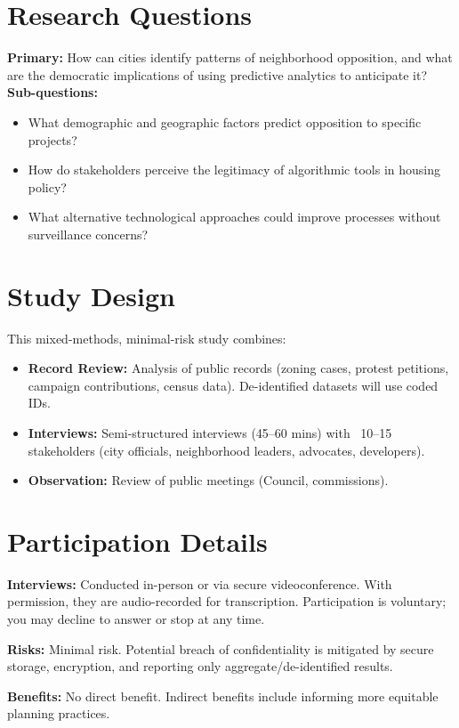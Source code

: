 \documentclass[10pt, letterpaper]{article}
\begin{document}
\section*{Research Questions}
\textbf{Primary:} How can cities identify patterns of neighborhood opposition, and what are the democratic implications of using predictive analytics to anticipate it? \\
\textbf{Sub-questions:}
\begin{itemize}[leftmargin=*, noitemsep]
    \item What demographic and geographic factors predict opposition to specific projects?
    \item How do stakeholders perceive the legitimacy of algorithmic tools in housing policy?
    \item What alternative technological approaches could improve processes without surveillance concerns?
\end{itemize}

\section*{Study Design}
This mixed-methods, minimal-risk study combines:
\begin{itemize}[leftmargin=*, noitemsep]
    \item \textbf{Record Review:} Analysis of public records (zoning cases, protest petitions, campaign contributions, census data). De-identified datasets will use coded IDs.
    \item \textbf{Interviews:} Semi-structured interviews (45–60 mins) with ~10–15 stakeholders (city officials, neighborhood leaders, advocates, developers).
    \item \textbf{Observation:} Review of public meetings (Council, commissions).
\end{itemize}

\section*{Participation Details}
\textbf{Interviews:} Conducted in-person or via secure videoconference. With permission, they are audio-recorded for transcription. Participation is voluntary; you may decline to answer or stop at any time.

\noindent \textbf{Risks:} Minimal risk. Potential breach of confidentiality is mitigated by secure storage, encryption, and reporting only aggregate/de-identified results.

\noindent \textbf{Benefits:} No direct benefit. Indirect benefits include informing more equitable planning practices.
\end{document}
